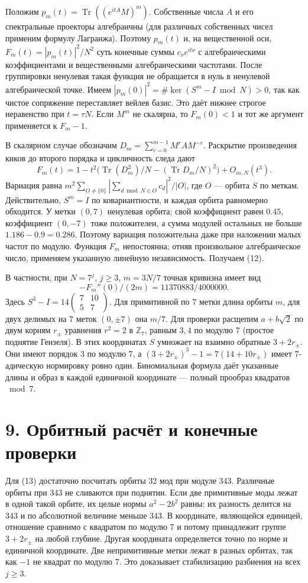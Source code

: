 \documentclass[11pt,a4paper]{article}
\newcommand{\Tr}{\operatorname{Tr}}
\newcommand{\Z}{\mathbb Z}
\newcommand{\sect}[1]{\section*{\sffamily\color{ink}#1}}
\begin{document}
Положим $p_m(t)=\Tr((e^{itA}M)^m)$. Собственные числа $A$ и его спектральные проекторы алгебраичны (для различных собственных чисел применим формулу Лагранжа). Поэтому $p_m(t)$ и, на вещественной оси, $F_m(t)=|p_m(t)|^2/N^2$ суть конечные суммы $c_\nu e^{it\nu}$ с алгебраическими коэффициентами и вещественными алгебраическими частотами. После группировки ненулевая такая функция не обращается в нуль в ненулевой алгебраической точке. Имеем $|p_m(0)|^2=\#\ker(S^m-I\bmod N)>0$, так как чистое сопряжение переставляет вейлев базис. Это даёт нижнее строгое неравенство при $t=\tau N$. Если $M^m$ не скалярна, то $F_m(0)<1$ и тот же аргумент применяется к $F_m-1$.

В скалярном случае обозначим $D_m=\sum_{r=0}^{m-1}M^r A M^{-r}$. Раскрытие произведения киков до второго порядка и цикличность следа дают
\[
 F_m(t)=1-t^2\big(\Tr(D_m^2)/N-(\Tr D_m/N)^2\big)+O_{m,N}(t^3).
\]
Вариация равна $m^2\sum_{O\ne\{0\}}|\sum_{d\bmod N\in O} c_d|^2/|O|$, где $O$ --- орбита $S$ по меткам. Действительно, $S^m=I$ по ковариантности, и каждая орбита равномерно обходится. У метки $(0,7)$ ненулевая орбита; свой коэффициент равен $0.45$, коэффициент $(0,-7)$ тоже положителен, а сумма модулей остальных не больше $1.186-0.9=0.286$. Поэтому вариация положительна даже при наложении малых частот по модулю. Функция $F_m$ непостоянна; отняв произвольное алгебраическое число, применяем указанную линейную независимость. Получаем (12).

В частности, при $N=7^j$, $j\ge3$, $m=3N/7$ точная кривизна имеет вид
\[
 -F_m''(0)/(2m)=11370883/4000000.                                         \tag{13}
\]
Здесь $S^3-I=14\left(\begin{smallmatrix}7&10\\5&7\end{smallmatrix}\right)$. Для примитивной по 7 метки длина орбиты $m$, для двух делимых на 7 меток $(0,\pm7)$ она $m/7$. Для проверки расщепим $a+b\sqrt2$ по двум корням $r_\pm$ уравнения $r^2=2$ в $\Z_7$, равным $3,4$ по модулю 7 (простое поднятие Гензеля). В этих координатах $S$ умножает на взаимно обратные $3+2r_\pm$. Они имеют порядок 3 по модулю 7, а $(3+2r_\pm)^3-1=7(14+10r_\pm)$ имеет 7-адическую нормировку ровно один. Биномиальная формула даёт указанные длины и образ в каждой единичной координате --- полный прообраз квадратов $\bmod 7$.
\newpage
\sect{9. Орбитный расчёт и конечные проверки}
Для (13) достаточно посчитать орбиты 32 мод при модуле 343. Различные орбиты при 343 не сливаются при поднятии. Если две примитивные моды лежат в одной такой орбите, их целые нормы $a^2-2b^2$ равны: их разность делится на 343 и по абсолютной величине меньше 343. В координате, являющейся единицей, отношение сравнимо с квадратом по модулю 7 и потому принадлежит группе $3+2r_\pm$ на любой глубине. Другая координата определяется точно по норме и единичной координате. Две непримитивные метки лежат в разных орбитах, так как $-1$ не квадрат по модулю 7. Это доказывает стабилизацию разбиения на всех $j\ge3$.
\end{document}
